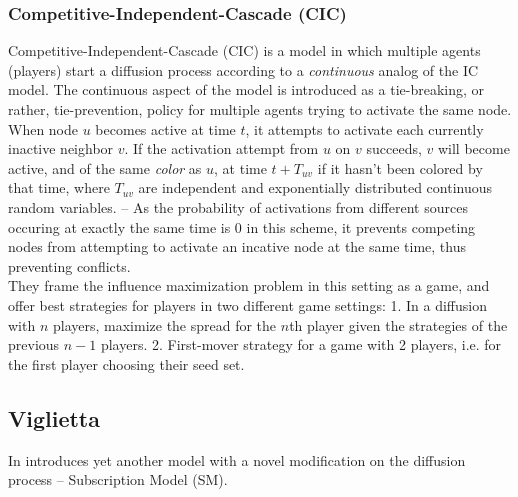 \documentclass[twocolumn, 10pt]{article}
\begin{document}
\subsubsection{Competitive-Independent-Cascade (CIC)}
Competitive-Independent-Cascade (CIC) is a model in which multiple agents (players) start  a diffusion process according to a \textit{continuous} analog of the IC model. The continuous aspect of the model is introduced as a tie-breaking, or rather, tie-prevention, policy for multiple agents trying to activate the same node.
When node $u$ becomes active at time $t$, it attempts to activate each currently inactive neighbor $v$. If the activation attempt from $u$ on $v$ succeeds, $v$ will become active, and of the same \textit{color} as $u$, at time $t+T_{uv}$ if it hasn't been colored by that time, where $T_{uv}$ are independent and exponentially distributed continuous random variables. -- As the probability of activations from different sources occuring at exactly the same time is 0 in this scheme, it prevents competing nodes from attempting to activate an incative node at the same time, thus preventing conflicts.\\
They frame the influence maximization problem in this setting as a game, and offer best strategies for players in two different game settings: 1. In a diffusion with $n$ players, maximize the spread for the $n$th player given the strategies of the previous $n-1$ players. 2. First-mover strategy for a game with 2 players, i.e. for the first player choosing their seed set.
\subsection{Viglietta \cite{vig}}
In \cite{vig} introduces yet another model with a novel modification on the diffusion process -- Subscription Model (SM).
\end{document}
